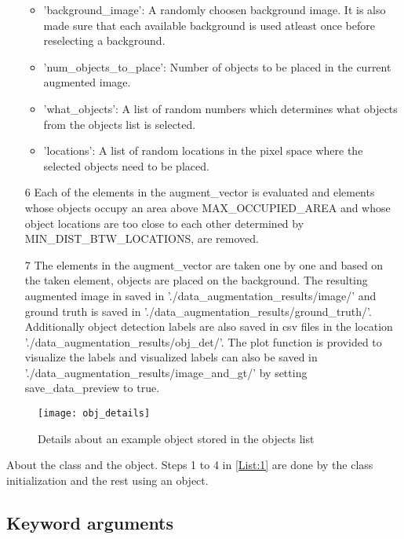\documentclass[paper=a4,11pt,parskip=half,toc=listof]{scrartcl}
\begin{document}
\begin{itemize}
			\begin{itemize}
				\item 'background\_image': A randomly choosen background image. It is also made sure that each available background is used atleast once before reselecting a background.
				\item 'num\_objects\_to\_place': Number of objects to be placed in the current augmented image.
				\item 'what\_objects': A list of random numbers which determines what objects from the objects list is selected.
				\item 'locations': A list of random locations in the pixel space where the selected objects need to be placed.
			\end{itemize}
		\item[6] Each of the elements in the augment\_vector is evaluated and elements whose objects occupy an area above MAX\_OCCUPIED\_AREA and whose object locations are too close to each other determined by MIN\_DIST\_BTW\_LOCATIONS, are removed.
		\item[7] The elements in the augment\_vector are taken one by one and based on the taken element, objects are placed on the background. The resulting augmented image in saved in './data\_augmentation\_results/image/' and ground truth is saved in './data\_augmentation\_results/ground\_truth/'. Additionally object detection labels are also saved in csv files in the location './data\_augmentation\_results/obj\_det/'. The plot function is provided to visualize the labels and visualized labels can also be saved in './data\_augmentation\_results/image\_and\_gt/' by setting save\_data\_preview to true.
	\end{itemize}
	
	\begin{figure}[htb!]
		\centering
		\texttt{[image: obj\_details]}
		\caption{Details about an example object stored in the objects list}
		\label{Fig:7}
	\end{figure}
	
About the class and the object. Steps 1 to 4 in \ref{List:1} are done by the class initialization and the rest using an object.
	
\subsection{Keyword arguments}
\end{document}
